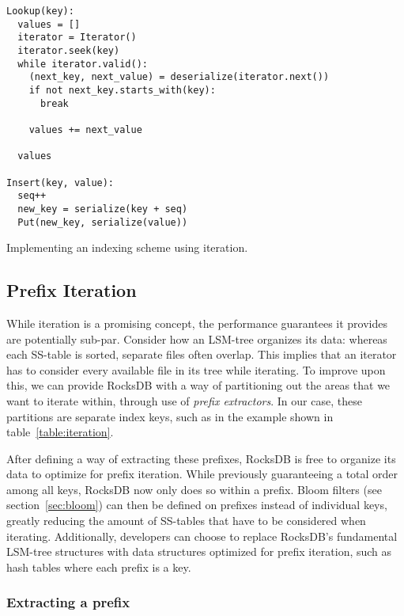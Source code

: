 \begin{listing}[H]
  \begin{verbatim}
Lookup(key):
  values = []
  iterator = Iterator()
  iterator.seek(key)
  while iterator.valid():
    (next_key, next_value) = deserialize(iterator.next())
    if not next_key.starts_with(key):
      break

    values += next_value

  values

Insert(key, value):
  seq++
  new_key = serialize(key + seq)
  Put(new_key, serialize(value))
  \end{verbatim}

  \caption{Implementing an indexing scheme using iteration.}\label{lst:iteration-example}
\end{listing}


\subsection{Prefix Iteration}

While iteration is a promising concept, the performance guarantees it provides
are potentially sub-par. Consider how an LSM-tree organizes its data: whereas
each SS-table is sorted, separate files often overlap. This implies that an
iterator has to consider every available file in its tree while iterating. To
improve upon this, we can provide RocksDB with a way of partitioning out the
areas that we want to iterate within, through use of \textit{prefix
extractors}. In our case, these partitions are separate index keys, such as
 in the example shown in table~\ref{table:iteration}.

After defining a way of extracting these prefixes, RocksDB is free to organize
its data to optimize for prefix iteration. While previously guaranteeing a total
order among all keys, RocksDB now only does so within a prefix. Bloom filters
(see section~\ref{sec:bloom}) can then be defined on prefixes instead of
individual keys, greatly reducing the amount of SS-tables that have to be
considered when iterating. Additionally, developers can choose to replace
RocksDB's fundamental LSM-tree structures with data structures optimized for
prefix iteration, such as hash tables where each prefix is a key.

\subsubsection{Extracting a prefix}

